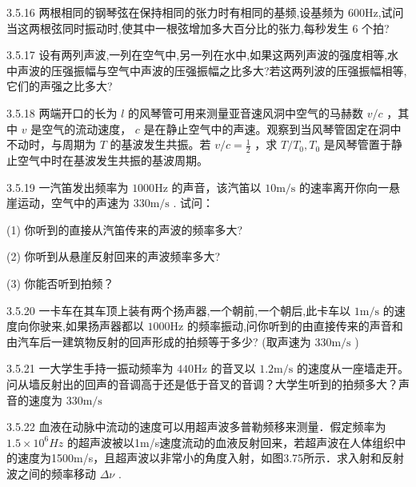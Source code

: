 \begin{problem}{3.5.16}
两根相同的钢琴弦在保持相同的张力时有相同的基频,设基频为 600Hz,试问当这两根弦同时振动时,使其中一根弦增加多大百分比的张力,每秒发生 6 个拍?
\end{problem}
\clearpage


\begin{problem}{3.5.17}
设有两列声波,一列在空气中,另一列在水中,如果这两列声波的强度相等,水中声波的压强振幅与空气中声波的压强振幅之比多大?若这两列波的压强振幅相等,它们的声强之比多大?
\end{problem}
\clearpage


\begin{problem}{3.5.18}
两端开口的长为 $l$ 的风琴管可用来测量亚音速风洞中空气的马赫数 $v / c$ ，其中 $v$ 是空气的流动速度， $c$ 是在静止空气中的声速。观察到当风琴管固定在洞中不动时，与周期为 $T$ 的基波发生共振。若 $v / c = \frac{1}{2}$ ，求 $T / T_0, T_0$ 是风琴管置于静止空气中时在基波发生共振的基波周期。
\end{problem}
\clearpage


\begin{problem}{3.5.19}
一汽笛发出频率为 $1000\mathrm{Hz}$ 的声音，该汽笛以 $10\mathrm{m / s}$ 的速率离开你向一悬崖运动，空气中的声速为 $330\mathrm{m / s}$ . 试问：

(1) 你听到的直接从汽笛传来的声波的频率多大?

(2) 你听到从悬崖反射回来的声波频率多大?

(3) 你能否听到拍频？
\end{problem}
\clearpage


\begin{problem}{3.5.20}
一卡车在其车顶上装有两个扬声器,一个朝前,一个朝后,此卡车以 $1\mathrm{m / s}$ 的速度向你驶来,如果扬声器都以 $1000\mathrm{Hz}$ 的频率振动,问你听到的由直接传来的声音和由汽车后一建筑物反射的回声形成的拍频等于多少? (取声速为 $330\mathrm{m / s}$ )
\end{problem}
\clearpage


\begin{problem}{3.5.21}
一大学生手持一振动频率为 $440\mathrm{Hz}$ 的音叉以 $1.2\mathrm{m / s}$ 的速度从一座墙走开。问从墙反射出的回声的音调高于还是低于音叉的音调？大学生听到的拍频多大？声音的速度为 $330\mathrm{m / s}$
\end{problem}
\clearpage


\begin{problem}{3.5.22}
血液在动脉中流动的速度可以用超声波多普勒频移来测量．假定频率为 $1.5\times10^{6}Hz$ 的超声波被以1m/s速度流动的血液反射回来，若超声波在人体组织中的速度为1500m/s，且超声波以非常小的角度入射，如图3.75所示．求入射和反射波之间的频率移动 $\Delta\nu$ .
\begin{center}

\end{center}
\end{problem}
\clearpage


